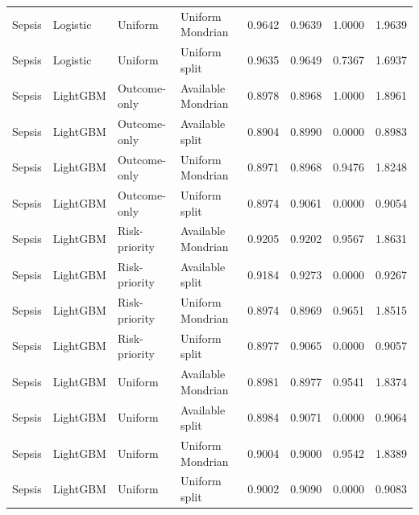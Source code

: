 \begin{longtable}{L{1cm}L{1.6cm}L{2.5cm}L{3.1cm}rrrr}
Sepsis & Logistic & Uniform & Uniform Mondrian & 0.9642 & 0.9639 & 1.0000 & 1.9639 \\
Sepsis & Logistic & Uniform & Uniform split & 0.9635 & 0.9649 & 0.7367 & 1.6937 \\
Sepsis & LightGBM & Outcome-only & Available Mondrian & 0.8978 & 0.8968 & 1.0000 & 1.8961 \\
Sepsis & LightGBM & Outcome-only & Available split & 0.8904 & 0.8990 & 0.0000 & 0.8983 \\
Sepsis & LightGBM & Outcome-only & Uniform Mondrian & 0.8971 & 0.8968 & 0.9476 & 1.8248 \\
Sepsis & LightGBM & Outcome-only & Uniform split & 0.8974 & 0.9061 & 0.0000 & 0.9054 \\
Sepsis & LightGBM & Risk-priority & Available Mondrian & 0.9205 & 0.9202 & 0.9567 & 1.8631 \\
Sepsis & LightGBM & Risk-priority & Available split & 0.9184 & 0.9273 & 0.0000 & 0.9267 \\
Sepsis & LightGBM & Risk-priority & Uniform Mondrian & 0.8974 & 0.8969 & 0.9651 & 1.8515 \\
Sepsis & LightGBM & Risk-priority & Uniform split & 0.8977 & 0.9065 & 0.0000 & 0.9057 \\
Sepsis & LightGBM & Uniform & Available Mondrian & 0.8981 & 0.8977 & 0.9541 & 1.8374 \\
Sepsis & LightGBM & Uniform & Available split & 0.8984 & 0.9071 & 0.0000 & 0.9064 \\
Sepsis & LightGBM & Uniform & Uniform Mondrian & 0.9004 & 0.9000 & 0.9542 & 1.8389 \\
Sepsis & LightGBM & Uniform & Uniform split & 0.9002 & 0.9090 & 0.0000 & 0.9083 \\
\end{longtable}
